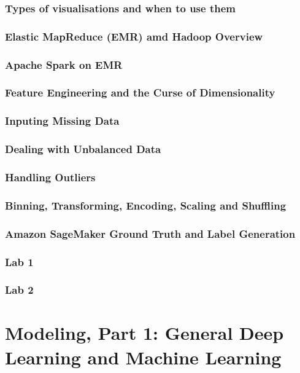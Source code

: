 \documentclass[11pt]{book}
\begin{document}
    \subsection{Types of visualisations and when to use them}
    \subsection{Elastic MapReduce (EMR) amd Hadoop Overview}
    \subsection{Apache Spark on EMR}
    \subsection{Feature Engineering and the Curse of Dimensionality}
    \subsection{Inputing Missing Data}
    \subsection{Dealing with Unbalanced Data}
    \subsection{Handling Outliers}
    \subsection{Binning, Transforming, Encoding, Scaling and Shuffling}
    \subsection{Amazon SageMaker Ground Truth and Label Generation}
    \subsection{Lab 1}
    \subsection{Lab 2}

    \chapter{Modeling, Part 1: General Deep Learning and Machine Learning}
\end{document}
